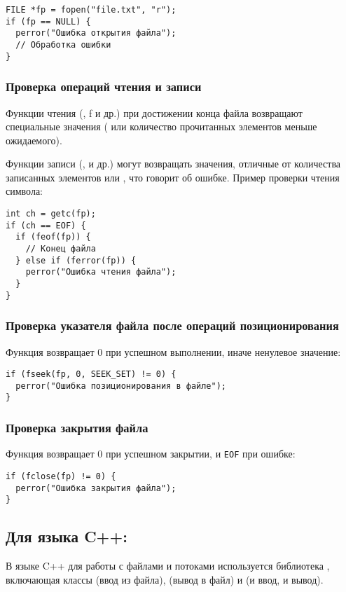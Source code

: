 \begin{verbatim}
FILE *fp = fopen("file.txt", "r");
if (fp == NULL) {
  perror("Ошибка открытия файла");
  // Обработка ошибки
}
\end{verbatim}

\subsubsection{Проверка операций чтения и записи}
Функции чтения (, f и др.) при достижении конца файла возвращают специальные значения (
или количество прочитанных элементов меньше ожидаемого).

Функции записи (,  и др.) могут возвращать значения, отличные от количества записанных элементов или , что говорит об ошибке.
Пример проверки чтения символа:

\begin{verbatim}
int ch = getc(fp);
if (ch == EOF) {
  if (feof(fp)) {
    // Конец файла
  } else if (ferror(fp)) {
    perror("Ошибка чтения файла");
  }
}
\end{verbatim}

\subsubsection{Проверка указателя файла после операций позиционирования}
Функция  возвращает 0 при успешном выполнении, иначе ненулевое значение:
\begin{verbatim}
if (fseek(fp, 0, SEEK_SET) != 0) {
  perror("Ошибка позиционирования в файле");
}
\end{verbatim}

\subsubsection{Проверка закрытия файла}
Функция  возвращает 0 при успешном закрытии, и \verb|EOF| при ошибке:
\begin{verbatim}
if (fclose(fp) != 0) {
  perror("Ошибка закрытия файла");
}
\end{verbatim}

\subsection{Для языка C++:}
В языке C++ для работы с файлами и потоками используется библиотека , включающая классы 
(ввод из файла),  (вывод в файл) и  (и ввод, и вывод).

